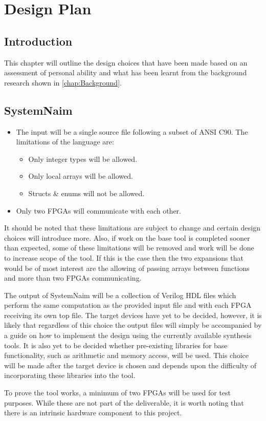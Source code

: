 \chapter{Design Plan}
\label{chap:Design}

\section{Introduction}
This chapter will outline the design choices that have been made based on an assessment of personal ability and what has been learnt from the background research shown in \autoref{chap:Background}.

\section{SystemNaim}

\begin{itemize}
    \item The input will be a single source file following a subset of ANSI C90. The limitations of the language are:
    \begin{itemize}
        \item Only integer types will be allowed.
        \item Only local arrays will be allowed.
        \item Structs \& enums will not be allowed.
    \end{itemize}
    \item Only two FPGAs will communicate with each other.
\end{itemize}

It should be noted that these limitations are subject to change and certain design choices will introduce more. Also, if work on the base tool is completed sooner than expected, some of these limitations will be removed and work will be done to increase scope of the tool. If this is the case then the two expansions that would be of most interest are the allowing of passing arrays between functions and more than two FPGAs communicating.

The output of SystemNaim will be a collection of Verilog HDL files which perform the same computation as the provided input file and with each FPGA receiving its own top file. The target devices have yet to be decided, however, it is likely that regardless of this choice the output files will simply be accompanied by a guide on how to implement the design using the currently available synthesis tools. It is also yet to be decided whether pre-existing libraries for base functionality, such as arithmetic and memory access, will be used. This choice will be made after the target device is chosen and depends upon the difficulty of incorporating these libraries into the tool.

To prove the tool works, a minimum of two FPGAs will be used for test purposes. While these are not part of the deliverable, it is worth noting that there is an intrinsic hardware component to this project.
